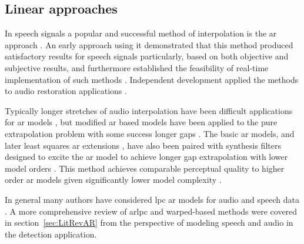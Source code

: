 
\subsection{Linear approaches}\label{sec:LitRev_RestorationLin}

In speech signals a popular and successful method of interpolation is the \DIFdelbegin {}\DIFdelend \DIFaddbegin \gls{ar} \DIFaddend approach \cite{Vaseghi1988thesis}\cite{Godsill1998book}\cite{Kauppinen2002b}. An early approach using it demonstrated that this method produced satisfactory results for speech signals particularly, based on both objective and subjective results, and furthermore established the feasibility of real-time implementation of such methods \cite{Janssen1986}. Independent development applied the methods to audio restoration applications \cite{Vaseghi1988thesis}\cite{Vaseghi1990}.

Typically longer stretches of audio interpolation have been difficult applications for \DIFdelbegin {}\DIFdelend \DIFaddbegin \gls{ar} \DIFaddend models \cite{Veldhuis1992}\cite{Kauppinen2002b}, but modified \DIFdelbegin {}\DIFdelend \DIFaddbegin \gls{ar} \DIFaddend based models have been applied to the pure extrapolation problem with some success \DIFdelbegin {}\DIFdelend \DIFaddbegin {}\DIFaddend longer gaps \cite{Kauppinen2002b}. The basic \DIFdelbegin {}\DIFdelend \DIFaddbegin \gls{ar} \DIFaddend models, and later least squares \DIFdelbegin {}\DIFdelend \DIFaddbegin \gls{ar} \DIFaddend extensions \cite{Godsill1998book}, have also been paired with synthesis filters designed to excite the \DIFdelbegin {}\DIFdelend \DIFaddbegin \gls{ar} \DIFaddend model to achieve longer gap extrapolation with lower model orders \cite{Esquef2006}. This method achieves comparable perceptual quality to higher order \DIFdelbegin {}\DIFdelend \DIFaddbegin \gls{ar} \DIFaddend models given significantly lower model complexity \cite{Esquef2006}.

In general many authors have considered \DIFdelbegin {}\DIFdelend \DIFaddbegin \gls{lpc} \gls{ar} \DIFaddend models for audio and speech data \cite{Vaseghi1990}\cite{Czyzewski1995}\cite{Godsill1998}. A more comprehensive review of \DIFdelbegin {}\DIFdelend \DIFaddbegin \gls{ar}\DIFadd{, }\gls{lpc} \DIFaddend and warped-based methods were covered in section~\ref{sec:LitRevAR} from the perspective of modeling speech and audio in the detection application.


